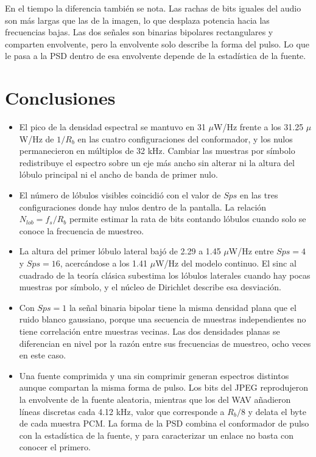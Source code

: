 \documentclass[twocolumn]{IEEEtran}
\begin{document}
En el tiempo la diferencia también se nota. Las rachas de bits iguales del audio son más largas que las de la imagen, lo que desplaza potencia hacia las frecuencias bajas. Las dos señales son binarias bipolares rectangulares y comparten envolvente, pero la envolvente solo describe la forma del pulso. Lo que le pasa a la PSD dentro de esa envolvente depende de la estadística de la fuente.

\section{Conclusiones}

\begin{itemize}

\item El pico de la densidad espectral se mantuvo en 31 $\mu$W/Hz frente a los 31.25 $\mu$W/Hz de $1/R_b$ en las cuatro configuraciones del conformador, y los nulos permanecieron en múltiplos de 32 kHz. Cambiar las muestras por símbolo redistribuye el espectro sobre un eje más ancho sin alterar ni la altura del lóbulo principal ni el ancho de banda de primer nulo.

\item El número de lóbulos visibles coincidió con el valor de $Sps$ en las tres configuraciones donde hay nulos dentro de la pantalla. La relación $N_{lob} = f_s / R_b$ permite estimar la rata de bits contando lóbulos cuando solo se conoce la frecuencia de muestreo.

\item La altura del primer lóbulo lateral bajó de 2.29 a 1.45 $\mu$W/Hz entre $Sps = 4$ y $Sps = 16$, acercándose a los 1.41 $\mu$W/Hz del modelo continuo. El sinc al cuadrado de la teoría clásica subestima los lóbulos laterales cuando hay pocas muestras por símbolo, y el núcleo de Dirichlet describe esa desviación.

\item Con $Sps = 1$ la señal binaria bipolar tiene la misma densidad plana que el ruido blanco gaussiano, porque una secuencia de muestras independientes no tiene correlación entre muestras vecinas. Las dos densidades planas se diferencian en nivel por la razón entre sus frecuencias de muestreo, ocho veces en este caso.

\item Una fuente comprimida y una sin comprimir generan espectros distintos aunque compartan la misma forma de pulso. Los bits del JPEG reprodujeron la envolvente de la fuente aleatoria, mientras que los del WAV añadieron líneas discretas cada 4.12 kHz, valor que corresponde a $R_b/8$ y delata el byte de cada muestra PCM. La forma de la PSD combina el conformador de pulso con la estadística de la fuente, y para caracterizar un enlace no basta con conocer el primero.

\end{itemize}
\end{document}
